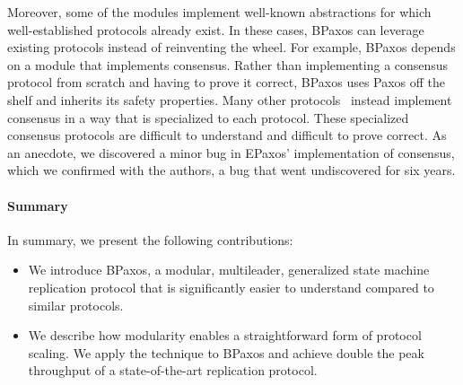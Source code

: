 Moreover, some of the modules implement well-known abstractions for which
well-established protocols already exist. In these cases, BPaxos can leverage
existing protocols instead of reinventing the wheel. For example, BPaxos
depends on a module that implements consensus. Rather than implementing a
consensus protocol from scratch and having to prove it correct, BPaxos uses
Paxos off the shelf and inherits its safety properties. Many other
protocols~\cite{moraru2013there, arun2017speeding, nawab2018dpaxos} instead
implement consensus in a way that is specialized to each protocol. These
specialized consensus protocols are difficult to understand and difficult to
prove correct. As an anecdote, we discovered a minor bug in EPaxos'
implementation of consensus, which we confirmed with the authors, a bug that
went undiscovered for six years.


\paragraph{Summary}
In summary, we present the following contributions:
\begin{itemize}
  \item
    We introduce BPaxos, a modular, multileader, generalized state machine
    replication protocol that is significantly easier to understand compared to
    similar protocols.
  \item
    We describe how modularity enables a straightforward form of protocol
    scaling. We apply the technique to BPaxos and achieve double the peak
    throughput of a state-of-the-art replication protocol.
\end{itemize}
